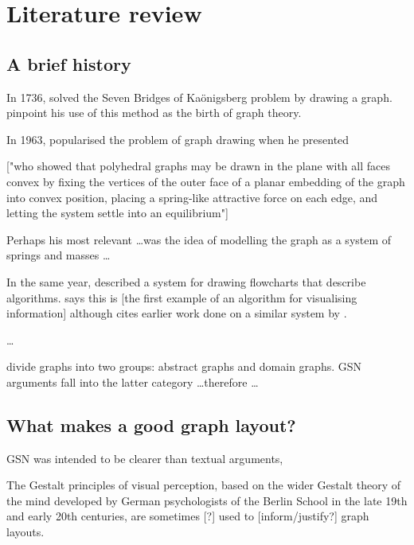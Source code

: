 \chapter{Literature review}


\section{A brief history}

In 1736, \citet{euler} solved the Seven Bridges of Ka\"{o}nigsberg problem by drawing a graph.
\citet{ismail2009some}
pinpoint his use of this method as the birth of graph theory.

In 1963, \citet{tutte} popularised the problem of graph drawing when he presented 

["who showed that polyhedral graphs may be drawn in the plane with all faces convex by fixing the vertices of the outer face of a planar embedding of the graph into convex position, placing a spring-like attractive force on each edge, and letting the system settle into an equilibrium"]

Perhaps his most relevant \ldots was the idea of modelling the graph as a system of springs and masses \ldots 

In the same year, \citet{Knuth63} described a system for drawing flowcharts that describe algorithms. \citet{battista}  says this is [the first example of an algorithm for visualising information] although \citeauthor{Knuth63} cites earlier work done on a similar system by \citet{haibt1959}.

\ldots

\citet{huang2007effects} divide graphs into two groups: abstract graphs and domain graphs.
GSN arguments fall into the latter category \ldots  therefore \ldots
{}







\section{What makes a good graph layout?}


GSN was intended to be clearer than textual arguments, 

The Gestalt principles of visual perception,
based on the wider Gestalt theory of the mind developed by German psychologists of the Berlin School in the late 19th and early 20th centuries,
are sometimes [?] used to [inform/justify?] graph layouts.

